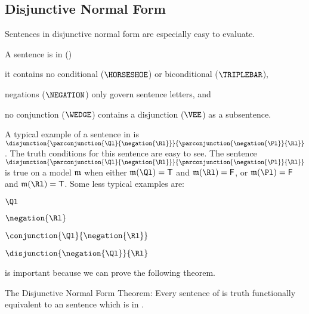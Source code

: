 \subsection{Disjunctive Normal Form}\label{Disjunctive Normal Form}

Sentences in disjunctive normal form are especially easy to evaluate.  
\begin{majorILnc}{}
A \GSL{} sentence is in  () \Iff
\begin{cenumerate}
\item it contains no conditional ($\HORSESHOE$) or biconditional ($\TRIPLEBAR$),
\item negations ($\NEGATION$) only govern sentence letters, and
\item no conjunction ($\WEDGE$) contains a disjunction ($\VEE$) as a subsentence.
\end{cenumerate}
\end{majorILnc}
\noindent{}A typical example of a sentence in  is $\disjunction{\parconjunction{\Ql}{\negation{\Rl}}}{\parconjunction{\negation{\Pl}}{\Rl}}$.  The truth conditions for this sentence are easy to see.  The sentence $\disjunction{\parconjunction{\Ql}{\negation{\Rl}}}{\parconjunction{\negation{\Pl}}{\Rl}}$ is true on a model $\mathfrak{m}$ when either $\IntA(\Ql)=\TrueB$ and $\IntA(\Rl)=\FalseB$, or $\IntA(\Pl)=\FalseB$ and $\IntA(\Rl)=\TrueB$.  Some less typical examples are:
\begin{menumerate}
\item $\Ql$
\item $\negation{\Rl}$
\item $\conjunction{\Ql}{\negation{\Rl}}$
\item $\disjunction{\negation{\Ql}}{\Rl}$
\end{menumerate}
 is important because we can prove the following theorem.
\begin{THEOREM}{ The Disjunctive Normal Form Theorem:}
Every sentence of \GSL{} is truth functionally equivalent to an \GSL{} sentence which is in .
\end{THEOREM}
